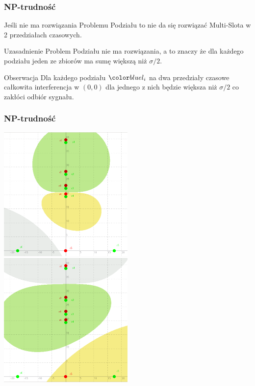 \documentclass[polish, t,10pt]{beamer}
\begin{document}
\begin{frame}
    \frametitle{NP-trudność}
    Jeśli nie ma rozwiązania Problemu Podziału to nie da się rozwiązać Multi-Slota w 2 przedziałach czasowych.
    \begin{block}{Uzasadnienie}
        Problem Podziału nie ma rozwiązania, a to znaczy że dla każdego podziału jeden ze zbiorów ma sumę większą niż $\sigma/2$.
    \end{block}
    \pause
    \begin{block}{Obserwacja}
        Dla każdego podziału $\li$ na dwa przedziały czasowe całkowita interferencja w $(0, 0)$ dla jednego z nich będzie większa niż $\sigma/2$ co zakłóci odbiór sygnału.
    \end{block}
\end{frame}
\begin{frame}
    \frametitle{NP-trudność}
    \centering
    \includegraphics[width=0.5\textwidth]{pictures/np-error1.png}
    \includegraphics[width=0.5\textwidth]{pictures/np-error2.png}
\end{frame}
\end{document}
